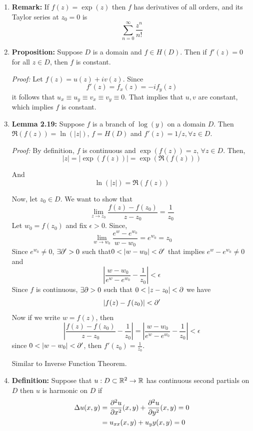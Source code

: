 \documentclass[12pt]{article}
\begin{document}
\begin{enumerate}
    \item \textbf{Remark:} If $f(z) = \exp(z)$ then $f$ has derivatives of all orders, and its Taylor series at $z_0 = 0$ is 
    \[\sum_{n=0}^\infty \frac{z^n}{n!}\]

    \item \textbf{Proposition:} Suppose $D$ is a domain and $f \in H(D)$. Then if $f'(z) = 0$ for all $z \in D$, then $f$ is constant. 
    
    \textit{Proof:} Let $f(z) = u(z) + iv(z)$. Since 
    \[f'(z) = f_x(z) = -if_y(z)\]
    it follows that $u_x \equiv u_y \equiv v_x \equiv v_y \equiv 0$. That implies that $u, v$ are constant, which implies $f$ is constant. 

    \item \textbf{Lemma 2.19:} Suppose $f$ is a branch of $\log(y)$ on a domain $D$. Then $\Re(f(z)) = \ln(|z|)$, $f = H(D)$ and $f'(z) = 1/z, \forall z \in D$. 
    

    \textit{Proof:} By definition, $f$ is continuous and $\exp(f(z)) = z$, $\forall z \in D$. Then, 
    \[|z| = |\exp(f(z))| = \exp(\Re(f(z)))\]

    And 
    \[\ln(|z|) = \Re(f(z))\]

    Now, let $z_0 \in D$. We want to show that 
    \[\lim_{z\to z_0} \frac{f(z) - f(z_0)}{z-z_0} = \frac{1}{z_0}\]
    Let $w_0 = f(z_0)$ and fix $\epsilon > 0$. Since, 
    \[\lim_{w \to w_0} \frac{e^w - e^{w_0}}{w- w_0} = e^{w_0} = z_0\]
    Since $e^{w_0} \neq 0$, $\exists \partial'>0$ such that$ 0 < |w - w_0| < \partial'$  that implies $e^w - e^{w_0 } \neq 0$ and 
    \[\left| \frac{w-w_0}{e^w - e^{w_0}} - \frac{1}{z_0}\right| < \epsilon\]
    Since $f$ is continuous, $\exists \partial > 0$ such that $0 < |z  -z_0| <\partial$ we have 
    \[|f(z) - f(z_0) |< \partial'\]
    Now if we write $w = f(z)$, then 
    \[\left| \frac{f(z) - f(z_0)}{z-z_0} - \frac{1}{z_0}\right| = \left| \frac{w - w_0}{e^w - e^{w_0}} - \frac{1}{z_0}\right|  < \epsilon\]
    since $0 < |w - w_0 | < \partial'$, then $f'(z_0) = \frac{1}{z_0}$.

    Similar to Inverse Function Theorem. 

    \item \textbf{Definition:} Suppose that $u : D \subset \mathbb R^2 \to \mathbb R$ has continuous second partials on $D$ then $u$ is harmonic on $D$ if 
    \begin{align*}
        \Delta u (x,y) &= \frac{\partial^2 u}{\partial x^2} (x,y) + \frac{\partial^2 u}{\partial y^2} (x,y)  = 0 \\
        &= u_{xx}(x,y) + u_yy (x,y)  = 0
    \end{align*}


\end{enumerate}
\end{document}
